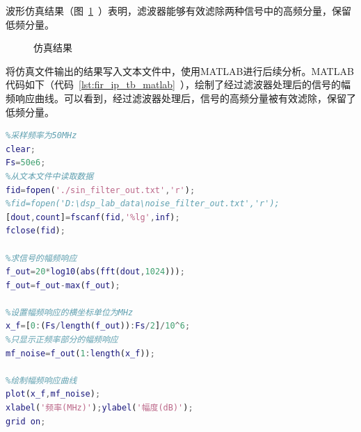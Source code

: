波形仿真结果（图~\ref{fig:exp7:sim_result}~）表明，滤波器能够有效滤除两种信号中的高频分量，保留低频分量。

\begin{figure}[htbp]
    \centering
    \hfill
    \caption{仿真结果} 
    \label{fig:exp7:sim_result}   
\end{figure}

将仿真文件输出的结果写入文本文件中，使用MATLAB进行后续分析。MATLAB代码如下（代码~\ref{lst:fir_ip_tb_matlab}~），绘制了经过滤波器处理后的信号的幅频响应曲线。可以看到，经过滤波器处理后，信号的高频分量被有效滤除，保留了低频分量。
\begin{lstlisting}[language=matlab,caption={MATLAB结果绘图代码},label=lst:fir_ip_tb_matlab]
%sim_data_Analyse.m
%采样频率为50MHz
clear;
Fs=50e6;        
%从文本文件中读取数据
fid=fopen('./sin_filter_out.txt','r');
%fid=fopen('D:\dsp_lab_data\noise_filter_out.txt','r');
[dout,count]=fscanf(fid,'%lg',inf);
fclose(fid);

%求信号的幅频响应
f_out=20*log10(abs(fft(dout,1024)));
f_out=f_out-max(f_out);

%设置幅频响应的横坐标单位为MHz
x_f=[0:(Fs/length(f_out)):Fs/2]/10^6;
%只显示正频率部分的幅频响应
mf_noise=f_out(1:length(x_f));

%绘制幅频响应曲线
plot(x_f,mf_noise);
xlabel('频率(MHz)');ylabel('幅度(dB)');
grid on;

\end{lstlisting}

